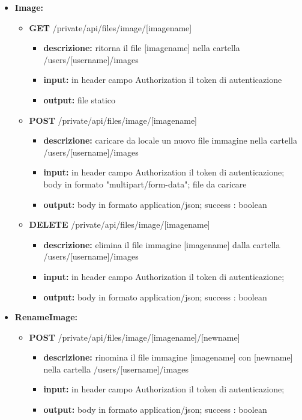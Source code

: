 {{\begin{itemize}
		\item \textbf{Image:}
			\begin{itemize}
			\item    \textbf{GET} /private/api/files/image/[imagename]
				\begin{itemize} 
				\item \textbf{descrizione:} ritorna il file [imagename] nella cartella /users/[username]/images					
				\item \textbf{input:} in header campo Authorization il token di autenticazione
				\item \textbf{output:} file statico
				\end{itemize}
			\item    \textbf{POST} /private/api/files/image/[imagename]
				\begin{itemize} 
				\item \textbf{descrizione:} caricare da locale un nuovo file immagine nella cartella /users/[username]/images					
				\item \textbf{input:} in header campo Authorization il token di autenticazione; body in formato "multipart/form-data"; file da caricare
				\item \textbf{output:} body in formato application/json; success : boolean
				\end{itemize}
			\item   \textbf{DELETE} /private/api/files/image/[imagename]
				\begin{itemize} 
				\item \textbf{descrizione:} elimina il file immagine [imagename] dalla cartella /users/[username]/images			
				\item \textbf{input:} in header campo Authorization il token di autenticazione;
				\item \textbf{output:} body in formato application/json; success : boolean
				\end{itemize}
			\end{itemize}
			
		\item \textbf{RenameImage:}
			\begin{itemize}
			\item   \textbf{POST} /private/api/files/image/[imagename]/[newname] 
				\begin{itemize} 
				\item \textbf{descrizione:} rinomina il file immagine [imagename] con [newname] nella cartella /users/[username]/images
				\item \textbf{input:} in header campo Authorization il token di autenticazione;
				\item \textbf{output:} body in formato application/json; success : boolean
				\end{itemize}
			\end{itemize}
			

\end{itemize}}}
